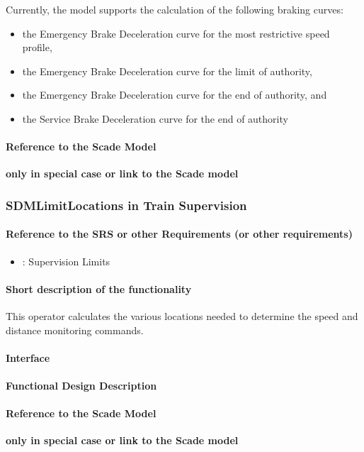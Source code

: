 Currently, the model supports the calculation of the following braking curves:
\begin{itemize}
	\item the Emergency Brake Deceleration curve for the most restrictive speed profile,
	\item the Emergency Brake Deceleration curve for the limit of authority,
	\item the Emergency Brake Deceleration curve for the end of authority, and
	\item the Service Brake Deceleration curve for the end of authority
\end{itemize}
\paragraph{Reference to the Scade Model}
\textbf{only in special case or link to the Scade model}

\subsubsection{SDMLimitLocations in Train Supervision} 
\paragraph{Reference to the SRS or other Requirements (or other requirements)}
\begin{itemize}
	\item \cite[Chapt.~3.13.9]{subset-026}: Supervision Limits 
\end{itemize}

\paragraph{Short description of the functionality}
This operator calculates the various locations needed to determine the speed and distance monitoring commands.

\paragraph{Interface}
\paragraph{Functional Design Description}
\paragraph{Reference to the Scade Model}
\textbf{only in special case or link to the Scade model}

